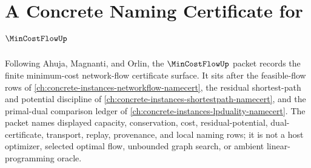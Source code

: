 \chapter{A Concrete Naming Certificate for $\MinCostFlowUp$}
\label{ch:concrete-instances-min-cost-flow-namecert}

Following Ahuja, Magnanti, and Orlin, the $\MinCostFlowUp$ packet records the finite minimum-cost network-flow certificate surface. It sits after the feasible-flow rows of \autoref{ch:concrete-instances-networkflow-namecert}, the residual shortest-path and potential discipline of \autoref{ch:concrete-instances-shortestpath-namecert}, and the primal-dual comparison ledger of \autoref{ch:concrete-instances-lpduality-namecert}. The packet names displayed capacity, conservation, cost, residual-potential, dual-certificate, transport, replay, provenance, and local naming rows; it is not a host optimizer, selected optimal flow, unbounded graph search, or ambient linear-programming oracle.

